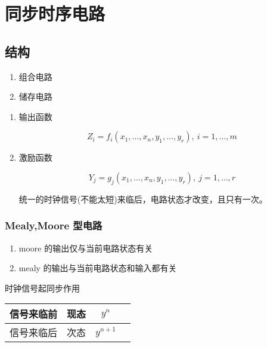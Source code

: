 \chapter{同步时序电路}
\newpage

\section{结构}

\begin{enumerate}

    \item 组合电路
    \item 储存电路

\end{enumerate}

\begin{enumerate}

    \item 输出函数

          \begin{equation}
              Z_i=f_i(x_1,\dots,x_n,y_1,\dots,y_r),~i=1,\dots,m
          \end{equation}

    \item 激励函数

          \begin{equation}
              Y_j=g_j(x_1,\dots,x_n,y_1,\dots,y_r),~j=1,\dots,r
          \end{equation}

          统一的时钟信号(不能太短)来临后，电路状态才改变，且只有一次。

\end{enumerate}

\newpage

\subsection{Mealy,Moore 型电路}
\begin{enumerate}
    \item moore 的输出仅与当前电路状态有关
    \item mealy 的输出与当前电路状态和输入都有关
\end{enumerate}

\newpage

时钟信号起同步作用

\begin{table}[!htbp]
    \centering
    \begin{tabular}{lccc}
        \toprule
        信号来临前 & 现态 & $y^{n}$   \\
        \midrule
        信号来临后 & 次态 & $y^{n+1}$ \\
        \bottomrule
    \end{tabular}
\end{table}

